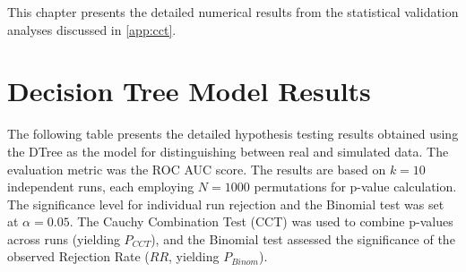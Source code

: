\begin{appendices}
  This chapter presents the detailed numerical results from the statistical validation analyses discussed in \autoref{app:cct}.

  \section{Decision Tree Model Results}
  \label{sec:dt_results_appendix}

  The following table presents the detailed hypothesis testing results obtained using the DTree as the model for distinguishing between real and simulated data. The evaluation metric was the ROC AUC score. The results are based on $k=10$ independent runs, each employing $N=1000$ permutations for p-value calculation. The significance level for individual run rejection and the Binomial test was set at $\alpha=0.05$. The Cauchy Combination Test (CCT) was used to combine p-values across runs (yielding $P_{CCT}$), and the Binomial test assessed the significance of the observed Rejection Rate ($RR$, yielding $P_{Binom}$).


\end{appendices}
